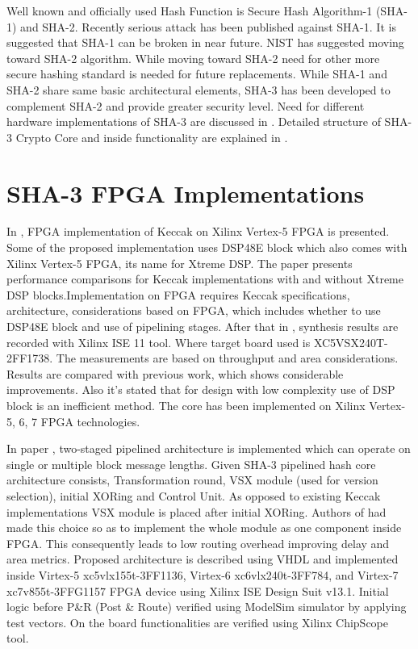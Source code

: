 Well known and officially used Hash Function is Secure Hash Algorithm-1 (SHA-1) and SHA-2. Recently serious attack has been published against SHA-1. It is suggested that SHA-1 can be broken in near future. NIST has suggested moving toward SHA-2 algorithm. While moving toward SHA-2 need for other more secure hashing standard is needed for future replacements. While SHA-1 and SHA-2 share same basic architectural elements, SHA-3 has been developed to complement SHA-2 and provide greater security level. Need for different hardware implementations of SHA-3 are discussed in \cite{tosha3}. Detailed structure of SHA-3 Crypto Core and inside functionality are explained in \cite{insha3}. \par

\section{SHA-3 FPGA Implementations}

In \cite{fpgades}, FPGA implementation of Keccak on Xilinx Vertex-5 FPGA is presented. Some of the proposed implementation uses DSP48E block which also comes with Xilinx Vertex-5 FPGA, its name for Xtreme DSP. The paper presents performance comparisons for Keccak implementations with and without Xtreme DSP blocks.Implementation on FPGA requires Keccak specifications, architecture, considerations based on FPGA, which includes whether to use DSP48E block and use of pipelining stages. After that in \cite{fpgades}, synthesis results are recorded with Xilinx ISE 11 tool. Where target board used is XC5VSX240T-2FF1738.  The measurements are based on throughput and area considerations. Results are compared with previous work, which shows considerable improvements. Also it’s stated that for design with low complexity use of DSP block is an inefficient method. The core has been implemented on Xilinx Vertex-5, 6, 7 FPGA technologies. \par

In paper \cite{hight}, two-staged pipelined architecture is implemented which can operate on single or multiple block message lengths. Given SHA-3 pipelined hash core architecture consists, Transformation round, VSX module (used for version selection), initial XORing and Control Unit. As opposed to existing Keccak implementations VSX module is placed after initial XORing. Authors of \cite{hight} had made this choice so as to implement the whole module as one component inside FPGA. This consequently leads to low routing overhead improving delay and area metrics. Proposed architecture is described using VHDL and implemented inside Virtex-5 xc5vlx155t-3FF1136, Virtex-6 xc6vlx240t-3FF784, and Virtex-7 xc7v855t-3FFG1157 FPGA device using Xilinx ISE Design Suit v13.1. Initial logic before P\&R (Post \& Route) verified using ModelSim simulator by applying test vectors. On the board functionalities are verified using Xilinx ChipScope tool. \par

